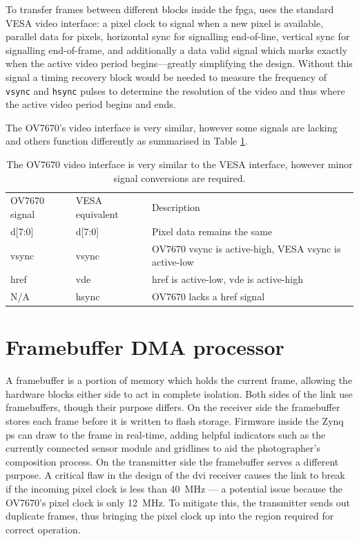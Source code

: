 To transfer frames between different blocks inside the \gls{fpga}, uses the standard VESA video interface: a pixel clock to signal when a new pixel is available, parallel data for pixels, horizontal sync for signalling end-of-line, vertical sync for signalling end-of-frame, and additionally a data valid signal which marks exactly when the active video period begins---greatly simplifying the design. Without this signal a timing recovery block would be needed to measure the frequency of \texttt{vsync} and \texttt{hsync} pulses to determine the resolution of the video and thus where the active video period begins and ends.

The OV7670's video interface is very similar, however some signals are lacking and others function differently as summarised in Table \ref{table:ov7670_video_interface}. 

\begin{table}
  \begin{tabular}{lll}
  OV7670 signal   & VESA equivalent & Description                                           \\
  d[7:0]          & d[7:0]          & Pixel data remains the same                           \\
  vsync           & vsync           & OV7670 vsync is active-high, VESA vsync is active-low \\
  href            & vde             & href is active-low, vde is active-high                \\
  N/A             & hsync           & OV7670 lacks a href signal
  \end{tabular}
  \caption{The OV7670 video interface is very similar to the VESA interface, however minor signal conversions are required.}
  \label{table:ov7670_video_interface}
\end{table}




\section{Framebuffer DMA processor}
\label{sec:framebuffer_dma}

A framebuffer is a portion of memory which holds the current frame, allowing the hardware blocks either side to act in complete isolation. Both sides of the link use framebuffers, though their purpose differs. On the receiver side the framebuffer stores each frame before it is written to flash storage. Firmware inside the Zynq \gls{ps}  can draw to the frame in real-time, adding helpful indicators such as the currently connected sensor module and gridlines to aid the photographer's composition process. On the transmitter side the framebuffer serves a different purpose. A critical flaw in the design of the \gls{dvi} receiver causes the link to break if the incoming pixel clock is less than \SI{40}{\mega\hertz} --- a potential issue because the OV7670's pixel clock is only \SI{12}{\mega\hertz}. To mitigate this, the transmitter sends out duplicate frames, thus bringing the pixel clock up into the region required for correct operation.

